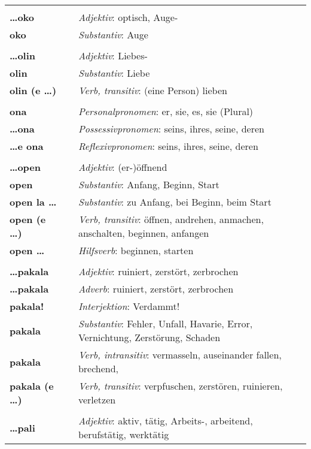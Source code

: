 \begin{supertabular}{p{2,5cm}|ll}
 && \\ %
\textbf{\dots oko} && \textit{Adjektiv}: optisch, Auge- \\ 
\textbf{oko} && \textit{Substantiv}: Auge \\ 
 && \\ %
\textbf{\dots olin} && \textit{Adjektiv}: Liebes- \\ 
\textbf{olin} && \textit{Substantiv}: Liebe \\ 
\textbf{olin (e \dots)} && \textit{Verb, transitiv}: (eine Person) lieben \\ 
 && \\ %
\textbf{ona} && \textit{Personalpronomen}: er, sie, es, sie (Plural)  \\ 
\textbf{\dots ona} && \textit{Possessivpronomen}: seins, ihres, seine, deren \\  
\textbf{\dots e ona} && \textit{Reflexivpronomen}: seins, ihres, seine, deren \\  
 && \\ %
\textbf{\dots open} && \textit{Adjektiv}: (er-)öffnend \\ 
\textbf{open} && \textit{Substantiv}: Anfang, Beginn, Start  \\ 
\textbf{open la \dots} && \textit{Substantiv}: zu Anfang, bei Beginn, beim Start \\ 
\textbf{open (e \dots)} && \textit{Verb, transitiv}: öffnen, andrehen, anmachen, anschalten, beginnen, anfangen \\ 
\textbf{open \dots } && \textit{Hilfsverb}: beginnen, starten \\ 
 && \\ %
\textbf{\dots pakala} && \textit{Adjektiv}: ruiniert, zerstört, zerbrochen \\ 
\textbf{\dots pakala} && \textit{Adverb}: ruiniert, zerstört, zerbrochen \\ 
\textbf{pakala!} && \textit{Interjektion}: Verdammt! \\ 
\textbf{pakala} && \textit{Substantiv}: Fehler, Unfall, Havarie, Error, Vernichtung, Zerstörung, Schaden \\ 
\textbf{pakala} && \textit{Verb, intransitiv}: vermasseln, auseinander fallen, brechend,  \\ 
\textbf{pakala (e \dots)} && \textit{Verb, transitiv}: verpfuschen, zerstören, ruinieren, verletzen \\ 
 && \\ %
\textbf{\dots pali} && \textit{Adjektiv}: aktiv, tätig, Arbeits-, arbeitend, berufstätig, werktätig \\ 

\end{supertabular}
